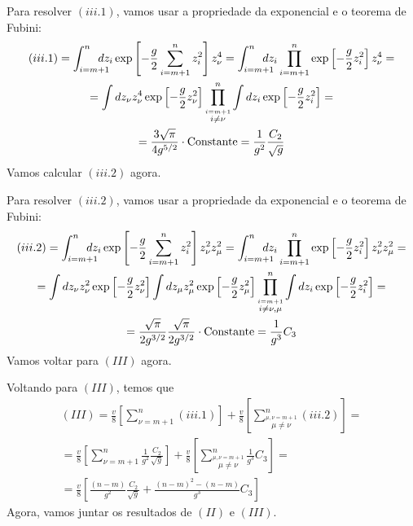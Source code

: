 \documentclass{beamer}
\begin{document}
\begin{frame}
	Para resolver $(iii.1)$, vamos usar a propriedade da exponencial e o teorema de Fubini:
	{\small
	\begin{multline*}
		(iii.1) = \int_{i=m+1}^{n}\hspace{-12pt} dz_i \exp\left[ -\frac{g}{2}\sum_{i=m+1}^{n}  z_i^2 \right]z_\nu^4 = \int_{i=m+1}^{n}\hspace{-12pt} dz_i \prod_{i=m+1}^{n}\exp\left[ -\frac{g}{2}  z_i^2 \right]z_\nu^4 = \\ 
		= \int dz_\nu z_\nu^4 \exp\left[-\frac{g}{2}z_\nu^2\right] \prod_{\stackrel{i=m+1}{i\neq\nu}}^{n}\int dz_i\exp\left[ -\frac{g}{2}  z_i^2 \right] = \\  
		=\frac{3\sqrt{\pi}}{4g^{5/2}} \cdot \text{Constante} = \frac{1}{g^2}\frac{C_2}{\sqrt{g}} 
	\end{multline*}}
	Vamos calcular $(iii.2)$ agora.
\end{frame}

\begin{frame}
	Para resolver $(iii.2)$, vamos usar a propriedade da exponencial e o teorema de Fubini:
	{\small
	\begin{multline*}
		(iii.2) = \int_{i=m+1}^{n}\hspace{-12pt} dz_i \exp\left[ -\frac{g}{2}\sum_{i=m+1}^{n}  z_i^2 \right]z_\nu^2z_\mu^2 = \int_{i=m+1}^{n}\hspace{-12pt} dz_i \prod_{i=m+1}^{n}\exp\left[ -\frac{g}{2}  z_i^2 \right]z_\nu^2z_\mu^2 = \\ 
		= \int dz_\nu z_\nu^2 \exp\left[-\frac{g}{2}z_\nu^2\right] \int dz_\mu z_\mu^2 \exp\left[-\frac{g}{2}z_\mu^2\right] \prod_{\stackrel{i=m+1}{i\neq\nu,\mu}}^{n}\int dz_i\exp\left[ -\frac{g}{2}  z_i^2 \right] = \\  
		=\frac{\sqrt{\pi}}{2g^{3/2}}\frac{\sqrt{\pi}}{2g^{3/2}} \cdot \text{Constante} = \frac{1}{g^3}C_3
	\end{multline*}}
	Vamos voltar para $(III)$ agora.
\end{frame}

\begin{frame}
	Voltando para $(III)$, temos que
	{\small
	\begin{multline*}
		(III) = \frac{v}{8}\left[\sum_{\nu=m+1}^{n} (iii.1)\right] + \frac{v}{8}\left[\sum_{\stackrel{\mu,\nu=m+1}{\mu\neq\nu}}^{n} (iii.2)\right] = \\ 
		= \frac{v}{8}\left[\sum_{\nu=m+1}^{n} \frac{1}{g^2}\frac{C_2}{\sqrt{g}}\right] + \frac{v}{8}\left[\sum_{\stackrel{\mu,\nu=m+1}{\mu\neq\nu}}^{n} \frac{1}{g^3}C_3\right] = \\ 
		= \frac{v}{8}\left[\frac{(n-m)}{g^2}\frac{C_2}{\sqrt{g}} + \frac{(n-m)^2 - (n-m)}{g^3}C_3\right]
	\end{multline*}}
	Agora, vamos juntar os resultados de $(II)$ e $(III)$.
\end{frame}
\end{document}
